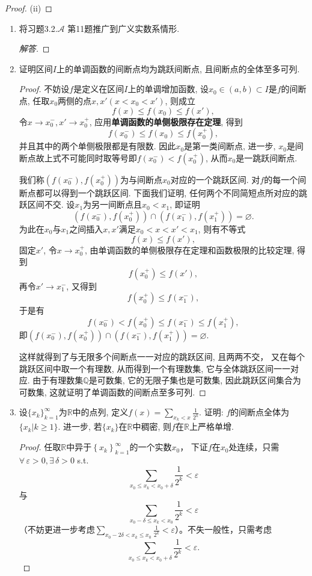 \begin{2a}
\begin{enumerate}
\begin{proof}
	(ii)
\end{proof}
\end{enumerate}
\end{2a}
\begin{2b}
\begin{enumerate}
\item 将习题3.2.\(\mathcal{A}\) 第11题推广到广义实数系情形.
\begin{proof}[解答]
	
\end{proof}
\item 证明区间\(I\)上的单调函数的间断点均为跳跃间断点, 且间断点的全体至多可列.
\begin{proof}
不妨设\(f\)是定义在区间\(I\)上的单调增加函数, 设\(x_0\in(a,b)\subset I\)是\(f\)的间断点, 任取\(x_0\)两侧的点\(x,x'(x<x_0<x')\), 则成立\[f(x)\leqslant f(x_0)\leqslant f(x'),\]令\(x\rightarrow x_0^-,x'\rightarrow x_0^+\), 应用\textbf{单调函数的单侧极限存在定理}, 得到\[f(x_0^-)\leqslant f(x_0)\leqslant f(x_0^+),\]并且其中的两个单侧极限都是有限数. 因此\(x_0\)是第一类间断点, 进一步, \(x_0\)是间断点故上式不可能同时取等号即\(f(x_0^-)<f(x_0^+)\), 从而\(x_0\)是一跳跃间断点.

我们称\(\left(f(x_0^-),f(x_0^+)\right)\)为与间断点\(x_0\)对应的一个跳跃区间. 对\(f\)的每一个间断点都可以得到一个跳跃区间. 下面我们证明, 任何两个不同简短点所对应的跳跃区间不交. 设\(x_1\)为另一间断点且\(x_0<x_1\), 即证明\[\left(f(x_0^-),f(x_0^+)\right)\cap \left(f(x_1^-),f(x_1^+)\right)=\varnothing.\]
为此在\(x_0\)与\(x_1\)之间插入\(x,x'\)满足\(x_0<x<x'<x_1\), 则有不等式
\[f(x)\leqslant f(x'),\]
固定\(x'\), 令\(x\rightarrow x_0^+\), 由单调函数的单侧极限存在定理和函数极限的比较定理, 得到
\[f(x_0^+)\leqslant f(x'),\]再令\(x'\rightarrow x_1^-\), 又得到
\[f(x_0^+)\leqslant f(x_1^-),\]于是有
\[f(x_0^-)<f(x_0^+)\leqslant f(x_1^-)\leqslant f(x_1^+),\]
即\(\left(f(x_0^-),f(x_0^+)\right)\cap \left(f(x_1^-),f(x_1^+)\right)=\varnothing.\)

这样就得到了与无限多个间断点一一对应的跳跃区间, 且两两不交， 
又在每个跳跃区间中取一个有理数, 从而得到一个有理数集, 它与全体跳跃区间一一对应. 
由于有理数集\(\mathbb{Q}\)是可数集, 它的无限子集也是可数集, 
因此跳跃区间集合为可数集, 这就证明了单调函数的间断点至多可列.
\end{proof}
\item 设\(\{x_k\}_{k=1}^{\infty}\)为\(\mathbb{R}\)中的点列, 
定义\(f(x)=\sum_{x_k<x}\frac{1}{2^k}\). 
证明: \(f\)的间断点全体为\(\{x_k|k\geqslant 1\}\). 
进一步, 若\(\{x_k\}\)在\(\mathbb{R}\)中稠密, 则\(f\)在\(\mathbb{R}\)上严格单增.
\begin{proof}
任取$\mathbb{R}$中异于$\left\{x_{k}\right\}_{k=1}^{\infty}$的一个实数$x_0$，
下证$f$在$x_0$处连续，只需$\forall \,\varepsilon>0,\exists\,\delta>0$ s.t. 
$$\sum\limits_{x_0 \le x_{k}<x_0+\delta}\frac{1}{2^k}<\varepsilon$$
与$$\sum\limits_{x_0-\delta \le x_{k}<x_0}\frac{1}{2^k}<\varepsilon$$
（不妨更进一步考虑$\sum\limits_{x_0-2\delta<x_{k}\le x_0}\frac{1}{2^k}
<\varepsilon$）。不失一般性，只需考虑
$$\sum\limits_{x_0 \le x_{k}<x_0+\delta}\frac{1}{2^k}<\varepsilon.$$


\end{proof}
\end{enumerate}
\end{2b}

